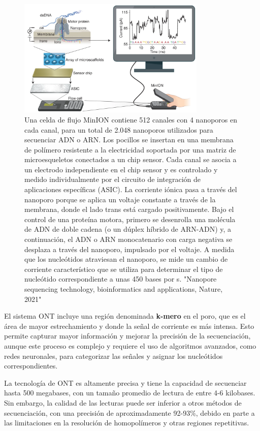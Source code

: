 \begin{figure}[htbp]
\centering
\includegraphics[width = 0.8\textwidth]{figs/nanopore.png}
\caption{Una celda de flujo MinION contiene 512 canales con 4 nanoporos en cada canal, para un total de 2.048 nanoporos utilizados para secuenciar ADN o ARN. Los pocillos se insertan en una membrana de polímero resistente a la electricidad soportada por una matriz de microesqueletos conectados a un chip sensor. Cada canal se asocia a un electrodo independiente en el chip sensor y es controlado y medido individualmente por el circuito de integración de aplicaciones específicas (ASIC). La corriente iónica pasa a través del nanoporo porque se aplica un voltaje constante a través de la membrana, donde el lado trans está cargado positivamente. Bajo el control de una proteína motora, primero se desenrolla una molécula de ADN de doble cadena (o un dúplex híbrido de ARN-ADN) y, a continuación, el ADN o ARN monocatenario con carga negativa se desplaza a través del nanoporo, impulsado por el voltaje. A medida que los nucleótidos atraviesan el nanoporo, se mide un cambio de corriente característico que se utiliza para determinar el tipo de nucleótido correspondiente a unas 450 bases por s. "Nanopore sequencing technology, bioinformatics and applications, Nature, 2021"}
\end{figure}

El sistema ONT incluye una región denominada \textbf{k-mero} en el poro, que es el área de mayor estrechamiento y donde la señal de corriente es más intensa. Esto permite capturar mayor información y mejorar la precisión de la secuenciación, aunque este proceso es complejo y requiere el uso de algoritmos avanzados, como redes neuronales, para categorizar las señales y asignar los nucleótidos correspondientes.

La tecnología de ONT es altamente precisa y tiene la capacidad de secuenciar hasta 500 megabases, con un tamaño promedio de lectura de entre 4-6 kilobases. Sin embargo, la calidad de las lecturas puede ser inferior a otros métodos de secuenciación, con una precisión de aproximadamente 92-93\%, debido en parte a las limitaciones en la resolución de homopolímeros y otras regiones repetitivas.

